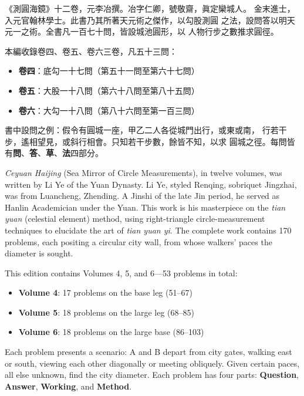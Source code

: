 \documentclass[9pt,a4paper]{article}
\begin{document}
\noindent\begin{minipage}[t]{0.48\textwidth}
《測圓海鏡》十二卷，元李冶撰。冶字仁卿，號敬齋，眞定欒城人。
金末進士，入元官翰林學士。此書乃其所著天元術之傑作，以勾股測圓
之法，設問答以明天元一之術。全書凡一百七十問，皆設城池圓形，以
人物行步之數推求圓徑。

本編收錄卷四、卷五、卷六三卷，凡五十三問：
\begin{itemize}[leftmargin=1em,itemsep=0pt,topsep=2pt]
  \item \textbf{卷四}：底勾一十七問（第五十一問至第六十七問）
  \item \textbf{卷五}：大股一十八問（第六十八問至第八十五問）
  \item \textbf{卷六}：大勾一十八問（第八十六問至第一百三問）
\end{itemize}

書中設問之例：假令有圓城一座，甲乙二人各從城門出行，或東或南，
行若干步，遙相望見，或斜行相會。只知若干步數，餘皆不知，以求
圓城之徑。每問皆有\textbf{問}、\textbf{答}、\textbf{草}、\textbf{法}四部分。
\end{minipage}%
\hfill%
\begin{minipage}[t]{0.50\textwidth}
\textit{Ceyuan Haijing} (Sea Mirror of Circle Measurements), in twelve volumes,
was written by Li Ye of the Yuan Dynasty. Li Ye, styled Renqing, sobriquet
Jingzhai, was from Luancheng, Zhending. A Jinshi of the late Jin period,
he served as Hanlin Academician under the Yuan. This work is his masterpiece
on the \textit{tian yuan} (celestial element) method, using right-triangle
circle-measurement techniques to elucidate the art of \textit{tian yuan yi}.
The complete work contains 170 problems, each positing a circular city wall,
from whose walkers' paces the diameter is sought.

This edition contains Volumes 4, 5, and 6---53 problems in total:
\begin{itemize}[leftmargin=1em,itemsep=0pt,topsep=2pt]
  \item \textbf{Volume 4}: 17 problems on the base leg (51--67)
  \item \textbf{Volume 5}: 18 problems on the large leg (68--85)
  \item \textbf{Volume 6}: 18 problems on the large base (86--103)
\end{itemize}

Each problem presents a scenario: A and B depart from city gates, walking
east or south, viewing each other diagonally or meeting obliquely. Given
certain paces, all else unknown, find the city diameter. Each problem has
four parts: \textbf{Question}, \textbf{Answer}, \textbf{Working}, and \textbf{Method}.
\end{minipage}
\vspace{0.15cm}
\end{document}
